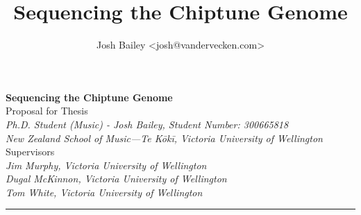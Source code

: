 \documentclass[10pt]{article}
\author{Josh Bailey <josh@vandervecken.com>}
\title{Sequencing the Chiptune Genome}
\begin{document}
        \begin{center}
          {\Large \textbf{Sequencing the Chiptune Genome}}\\
                \vspace{1em}
                Proposal for Thesis\\
                \vspace{1em}
                \textit{
                Ph.D. Student (Music) - Josh Bailey,
                Student Number: 300665818\\
                  New Zealand School of Music—Te Kōkī,
                  Victoria University of Wellington}\\
                \vspace{1em}
                Supervisors\\
                \vspace{1em}
                \textit{
                  Jim Murphy, Victoria University of Wellington\\
                  Dugal McKinnon, Victoria University of Wellington\\
                  Tom White, Victoria University of Wellington}\\
        \end{center}

        \begin{center}
                \rule{150mm}{0.2mm}
        \end{center}
\end{document}
